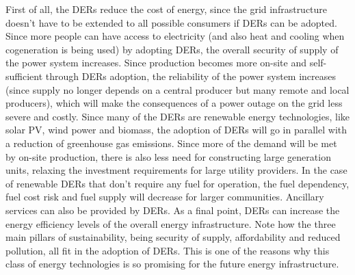  First of all, the DERs reduce the cost of energy, since the grid infrastructure doesn't have to be extended to all possible consumers if DERs can be adopted. Since more people can have access to electricity (and also heat and cooling when cogeneration is being used) by adopting DERs, the overall security of supply of the power system increases. Since production becomes more on-site and self-sufficient through DERs adoption, the reliability of the power system increases (since supply no longer depends on a central producer but many remote and local producers), which will make the consequences of a power outage on the grid less severe and costly. Since many of the DERs are renewable energy technologies, like solar PV, wind power and biomass, the adoption of DERs will go in parallel with a reduction of greenhouse gas emissions. Since more of the demand will be met by on-site production, there is also less need for constructing large generation units, relaxing the investment requirements for large utility providers. In the case of renewable DERs that don't require any fuel for operation, the fuel dependency, fuel cost risk and fuel supply will decrease for larger communities. Ancillary services can also be provided by DERs.  As a final point, DERs can increase the energy efficiency levels of the overall energy infrastructure. 
 \newline \newline \noindent
 Note how the three main pillars of sustainability, being security of supply, affordability and reduced pollution, all fit in the adoption of DERs. This is one of the reasons why this class of energy technologies is so promising for the future energy infrastructure.  
